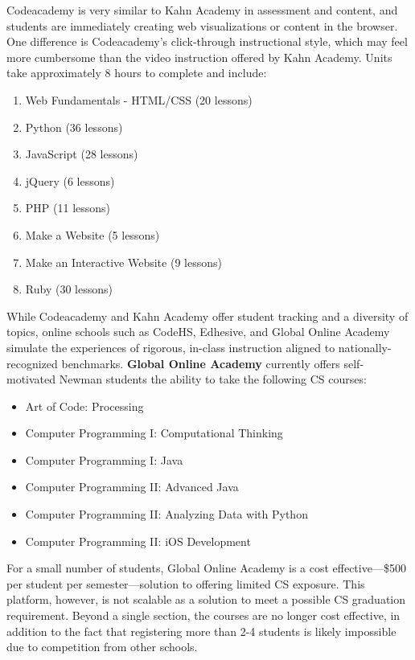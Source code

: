 Codeacademy is very similar to Kahn Academy in assessment and content, and students are immediately creating web visualizations or content in the browser. One difference is Codeacademy's click-through instructional style, which may feel more cumbersome than the video instruction offered by Kahn Academy. Units take approximately 8 hours to complete and include:
\begin{enumerate}
	\item Web Fundamentals - HTML/CSS (20 lessons)
	\item Python (36 lessons)
	\item JavaScript (28 lessons)
	\item jQuery (6 lessons)
	\item PHP (11 lessons)
	\item Make a Website (5 lessons)
	\item Make an Interactive Website (9 lessons)
	\item Ruby (30 lessons)
\end{enumerate}
While Codeacademy and Kahn Academy offer student tracking and a diversity of topics, online schools such as CodeHS, Edhesive, and Global Online Academy simulate the experiences of rigorous, in-class instruction aligned to nationally-recognized benchmarks. \textbf{Global Online Academy} \label{oga} currently offers self-motivated Newman students the ability to take the following CS courses:
\begin{itemize}
\item Art of Code: Processing
\item Computer Programming I: Computational Thinking
\item Computer Programming I: Java
\item Computer Programming II: Advanced Java
\item Computer Programming II: Analyzing Data with Python
\item Computer Programming II: iOS Development
\end{itemize}
For a small number of students, Global Online Academy is a cost effective---\$500 per student per semester---solution to offering limited CS exposure. This platform, however, is not scalable as a solution to meet a possible CS graduation requirement. Beyond a single section, the courses are no longer cost effective, in addition to the fact that registering more than 2-4 students is likely impossible due to competition from other schools.\par
